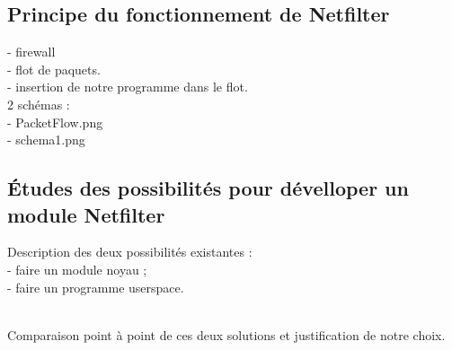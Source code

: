 \subsection{Principe du fonctionnement de Netfilter}
- firewall\\
- flot de paquets.\\
- insertion de notre programme dans le flot.\\
2 schémas : \\
- PacketFlow.png \cite{l7}\\
- schema1.png

\subsection{Études des possibilités pour dévelloper un module Netfilter}
Description des deux possibilités existantes :\\
- faire un module noyau ;\\
- faire un programme userspace.\\\

Comparaison point à point de ces deux solutions et justification de notre choix.